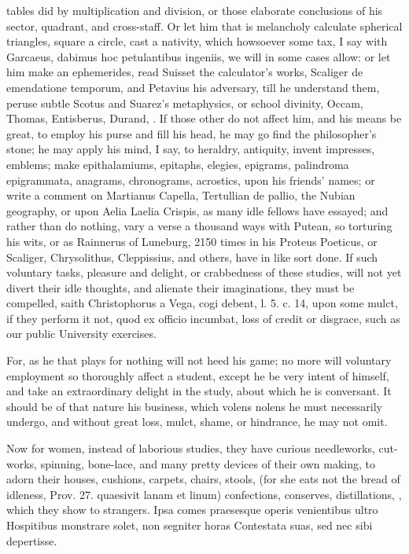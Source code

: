 {tables did by multiplication and division, or those elaborate
conclusions of his sector, quadrant, and cross-staff. Or let him
that is melancholy calculate spherical triangles, square a circle, cast
a nativity, which howsoever some tax, I say with Garcaeus,
dabimus hoc petulantibus ingeniis, we will in some cases allow: or let
him make an ephemerides, read Suisset the calculator's works, Scaliger
de emendatione temporum, and Petavius his adversary, till he understand
them, peruse subtle Scotus and Suarez's metaphysics, or school
divinity, Occam, Thomas, Entisberus, Durand, \etc{}. If those other do not
affect him, and his means be great, to employ his purse and fill his
head, he may go find the philosopher's stone; he may apply his mind, I
say, to heraldry, antiquity, invent impresses, emblems; make
epithalamiums, epitaphs, elegies, epigrams, palindroma epigrammata,
anagrams, chronograms, acrostics, upon his friends' names; or write a
comment on Martianus Capella, Tertullian de pallio, the Nubian
geography, or upon Aelia Laelia Crispis, as many idle fellows have
essayed; and rather than do nothing, vary a verse a thousand ways
with Putean, so torturing his wits, or as Rainnerus of Luneburg,
2150 times in his Proteus Poeticus, or Scaliger, Chrysolithus,
Cleppissius, and others, have in like sort done. If such voluntary
tasks, pleasure and delight, or crabbedness of these studies, will not
yet divert their idle thoughts, and alienate their imaginations, they
must be compelled, saith Christophorus a Vega, cogi debent, l. 5. c.
14, upon some mulct, if they perform it not, quod ex officio incumbat,
loss of credit or disgrace, such as our public University exercises.

For, as he that plays for nothing will not heed his game; no more will
voluntary employment so thoroughly affect a student, except he be very
intent of himself, and take an extraordinary delight in the study,
about which he is conversant. It should be of that nature his business,
which volens nolens he must necessarily undergo, and without great
loss, mulct, shame, or hindrance, he may not omit.

Now for women, instead of laborious studies, they have curious
needleworks, cut-works, spinning, bone-lace, and many pretty devices of
their own making, to adorn their houses, cushions, carpets, chairs,
stools, (for she eats not the bread of idleness, Prov.  27.
quaesivit lanam et linum) confections, conserves, distillations, \etc{},
which they show to strangers.
Ipsa comes praesesque operis venientibus ultro
Hospitibus monstrare solet, non segniter horas
Contestata suas, sed nec sibi depertisse.

}

